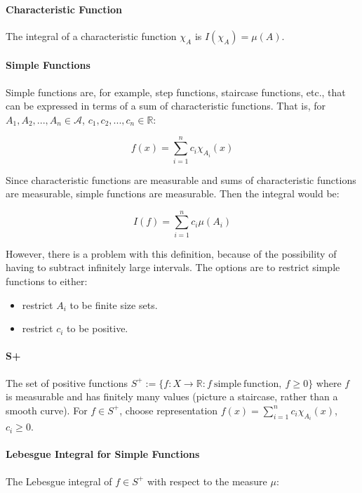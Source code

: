 \paragraph{Characteristic Function}
The integral of a characteristic function $\chi_A$ is $I(\chi_A) = \mu(A)$. 

\paragraph{Simple Functions}
Simple functions are, for example, step functions, staircase functions, etc., that can be expressed in terms of a sum of characteristic functions. That is, for $A_1,A_2,...,A_n\in\mathscr{A}$, $c_1,c_2,...,c_n\in\mathbb{R}$:

\begin{equation}
f(x) = \sum_{i=1}^n c_i \chi_{A_i}(x)
\end{equation}

Since characteristic functions are measurable and sums of characteristic functions are measurable, simple functions are measurable. Then the integral would be:

\begin{equation}
I(f) = \sum_{i=1}^n c_i \mu(A_i)
\end{equation}

However, there is a problem with this definition, because of the possibility of having to subtract infinitely large intervals. The options are to restrict simple functions to either: 

\begin{itemize}
\item restrict $A_i$ to be finite size sets.
\item restrict $c_i$ to be positive. 
\end{itemize}

\paragraph{S+}
The set of positive functions $S^+ := \{ f:X\rightarrow\mathbb{R} : f \mathrm{\ simple\ function},\ f\geq0\}$ where $f$ is measurable and has finitely many values (picture a staircase, rather than a smooth curve). For $f\in S^+$, choose representation $f(x) = \sum_{i=1}^n c_i \chi_{A_i}(x)$, $c_i \geq 0$. 



\paragraph{Lebesgue Integral for Simple Functions}
The Lebesgue integral of $f\in S^+$ with respect to the measure $\mu$:

